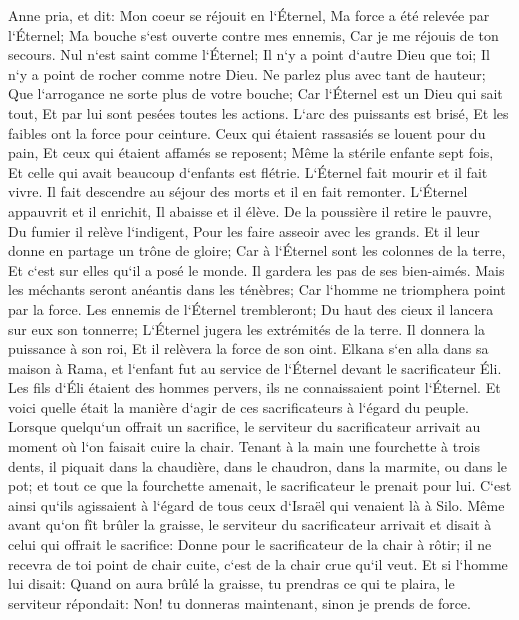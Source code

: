 \verse Anne pria, et dit: Mon coeur se réjouit en l`Éternel, Ma force a été relevée par l`Éternel; Ma bouche s`est ouverte contre mes ennemis, Car je me réjouis de ton secours. 
\verse Nul n`est saint comme l`Éternel; Il n`y a point d`autre Dieu que toi; Il n`y a point de rocher comme notre Dieu. 
\verse Ne parlez plus avec tant de hauteur; Que l`arrogance ne sorte plus de votre bouche; Car l`Éternel est un Dieu qui sait tout, Et par lui sont pesées toutes les actions. 
\verse L`arc des puissants est brisé, Et les faibles ont la force pour ceinture. 
\verse Ceux qui étaient rassasiés se louent pour du pain, Et ceux qui étaient affamés se reposent; Même la stérile enfante sept fois, Et celle qui avait beaucoup d`enfants est flétrie. 
\verse L`Éternel fait mourir et il fait vivre. Il fait descendre au séjour des morts et il en fait remonter. 
\verse L`Éternel appauvrit et il enrichit, Il abaisse et il élève. 
\verse De la poussière il retire le pauvre, Du fumier il relève l`indigent, Pour les faire asseoir avec les grands. Et il leur donne en partage un trône de gloire; Car à l`Éternel sont les colonnes de la terre, Et c`est sur elles qu`il a posé le monde. 
\verse Il gardera les pas de ses bien-aimés. Mais les méchants seront anéantis dans les ténèbres; Car l`homme ne triomphera point par la force. 
\verse Les ennemis de l`Éternel trembleront; Du haut des cieux il lancera sur eux son tonnerre; L`Éternel jugera les extrémités de la terre. Il donnera la puissance à son roi, Et il relèvera la force de son oint. 
\verse Elkana s`en alla dans sa maison à Rama, et l`enfant fut au service de l`Éternel devant le sacrificateur Éli. 
\verse Les fils d`Éli étaient des hommes pervers, ils ne connaissaient point l`Éternel. 
\verse Et voici quelle était la manière d`agir de ces sacrificateurs à l`égard du peuple. Lorsque quelqu`un offrait un sacrifice, le serviteur du sacrificateur arrivait au moment où l`on faisait cuire la chair. Tenant à la main une fourchette à trois dents, 
\verse il piquait dans la chaudière, dans le chaudron, dans la marmite, ou dans le pot; et tout ce que la fourchette amenait, le sacrificateur le prenait pour lui. C`est ainsi qu`ils agissaient à l`égard de tous ceux d`Israël qui venaient là à Silo. 
\verse Même avant qu`on fît brûler la graisse, le serviteur du sacrificateur arrivait et disait à celui qui offrait le sacrifice: Donne pour le sacrificateur de la chair à rôtir; il ne recevra de toi point de chair cuite, c`est de la chair crue qu`il veut. 
\verse Et si l`homme lui disait: Quand on aura brûlé la graisse, tu prendras ce qui te plaira, le serviteur répondait: Non! tu donneras maintenant, sinon je prends de force. 
